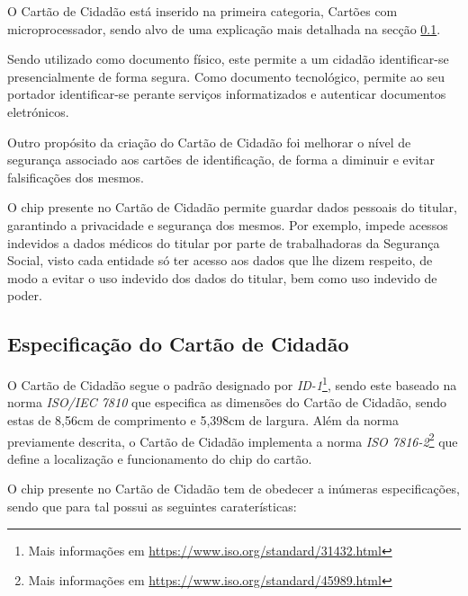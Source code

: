 O Cartão de Cidadão está inserido na primeira categoria, Cartões com microprocessador, sendo alvo de uma explicação mais detalhada na secção \ref{espCC}. 

Sendo utilizado como documento físico, este permite a um cidadão identificar-se presencialmente de forma segura. Como documento tecnológico, permite ao seu portador identificar-se perante serviços informatizados e autenticar documentos eletrónicos.

Outro propósito da criação do Cartão de Cidadão foi melhorar o nível de segurança associado aos cartões de identificação, de forma a diminuir e evitar falsificações dos mesmos.

O chip presente no Cartão de Cidadão permite guardar dados pessoais do titular, garantindo a privacidade e segurança dos mesmos. Por exemplo, impede acessos indevidos a dados médicos do titular por parte de trabalhadoras da Segurança Social, visto cada entidade só ter acesso aos dados que lhe dizem respeito, de modo a evitar o uso indevido dos dados do titular, bem como uso indevido de poder.

 

\subsection{Especificação do Cartão de Cidadão} \label{espCC}

O Cartão de Cidadão segue o padrão designado por \emph{ID-1}\footnote{Mais informações em \url{https://www.iso.org/standard/31432.html}}, sendo este baseado na norma \emph{ISO/IEC 7810} que especifica as dimensões do Cartão de Cidadão, sendo estas de 8,56cm de comprimento e 5,398cm de largura. Além da norma previamente descrita, o Cartão de Cidadão implementa a norma \emph{ISO 7816-2}\footnote{Mais informações em \url{https://www.iso.org/standard/45989.html}} que define a localização e funcionamento do chip do cartão.

O chip presente no Cartão de Cidadão tem de obedecer a inúmeras especificações, sendo que para tal possui as seguintes caraterísticas:

